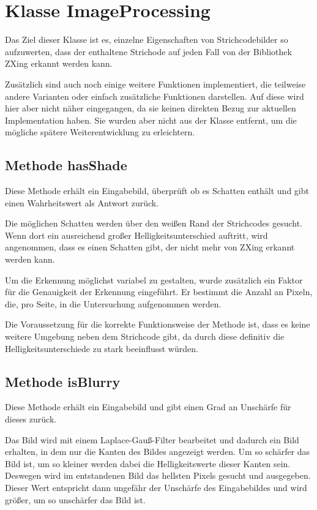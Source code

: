 \section{Klasse ImageProcessing}
\writtenby{\dcauthornameriren}%
Das Ziel dieser Klasse ist es, einzelne Eigenschaften von Strichcodebilder so aufzuwerten, dass der enthaltene Strichode auf jeden Fall von der Bibliothek ZXing erkannt werden kann.

Zusätzlich sind auch noch einige weitere Funktionen implementiert, die teilweise andere Varianten oder einfach zusätzliche Funktionen darstellen. Auf diese wird hier aber nicht näher eingegangen, da sie keinen direkten Bezug zur aktuellen Implementation haben. Sie wurden aber nicht aus der Klasse entfernt, um die mögliche spätere Weiterentwicklung zu erleichtern.


\subsection*{Methode hasShade}
Diese Methode erhält ein Eingabebild, überprüft ob es Schatten enthält und gibt einen Wahrheitswert als Antwort zurück.

Die möglichen Schatten werden über den weißen Rand der Strichcodes gesucht. Wenn dort ein ausreichend großer Helligkeitsunterschied auftritt, wird angenommen, dass es einen Schatten gibt, der nicht mehr von ZXing erkannt werden kann.

Um die Erkennung möglichst variabel zu gestalten, wurde zusätzlich ein Faktor für die Genauigkeit der Erkennung eingeführt. Er bestimmt die Anzahl an Pixeln, die, pro Seite, in die Untersuchung aufgenommen werden.

Die Voraussetzung für die korrekte Funktionsweise der Methode ist, dass es keine weitere Umgebung neben dem Strichcode gibt, da durch diese definitiv die Helligkeitsunterschiede zu stark beeinflusst würden.


\subsection*{Methode isBlurry}
Diese Methode erhält ein Eingabebild und gibt einen Grad an Unschärfe für dieses zurück.

Das Bild wird mit einem Laplace-Gauß-Filter bearbeitet und dadurch ein Bild erhalten, in dem nur die Kanten des Bildes angezeigt werden. Um so schärfer das Bild ist, um so kleiner werden dabei die Helligkeitswerte dieser Kanten sein. Deswegen wird im entstandenen Bild das hellsten Pixels gesucht und ausgegeben. Dieser Wert entspricht dann ungefähr der Unschärfe des Eingabebildes und wird größer, um so unschärfer das Bild ist.

